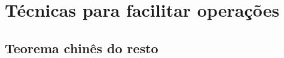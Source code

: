 \chapter {T\'ecnicas para facilitar opera\c{c}\~oes}
\label{TCR}

\section{Teorema chin\^es do resto}